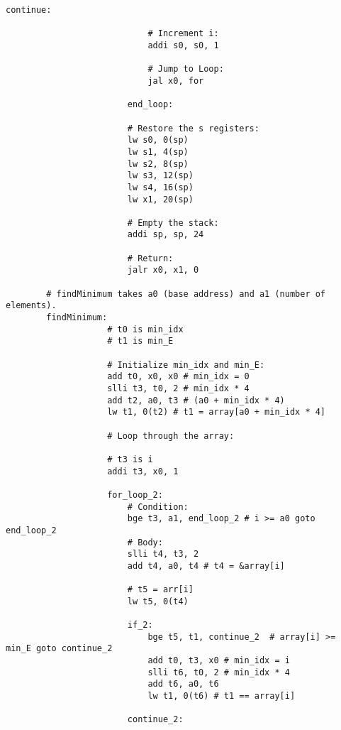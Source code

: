 \documentclass[12pt]{article}
\begin{document}
\begin{lstlisting}[language=RISCV]
                            continue:

                            # Increment i:
                            addi s0, s0, 1

                            # Jump to Loop:
                            jal x0, for

                        end_loop:

                        # Restore the s registers:
                        lw s0, 0(sp)
                        lw s1, 4(sp)
                        lw s2, 8(sp)
                        lw s3, 12(sp)
                        lw s4, 16(sp)
                        lw x1, 20(sp)

                        # Empty the stack:
                        addi sp, sp, 24 

                        # Return:
                        jalr x0, x1, 0

        # findMinimum takes a0 (base address) and a1 (number of elements).
        findMinimum:
                    # t0 is min_idx
                    # t1 is min_E

                    # Initialize min_idx and min_E:
                    add t0, x0, x0 # min_idx = 0
                    slli t3, t0, 2 # min_idx * 4
                    add t2, a0, t3 # (a0 + min_idx * 4) 
                    lw t1, 0(t2) # t1 = array[a0 + min_idx * 4]

                    # Loop through the array:

                    # t3 is i
                    addi t3, x0, 1

                    for_loop_2:
                        # Condition:
                        bge t3, a1, end_loop_2 # i >= a0 goto end_loop_2
                        # Body:
                        slli t4, t3, 2
                        add t4, a0, t4 # t4 = &array[i]
                        
                        # t5 = arr[i]
                        lw t5, 0(t4)

                        if_2:
                            bge t5, t1, continue_2  # array[i] >= min_E goto continue_2  
                            add t0, t3, x0 # min_idx = i
                            slli t6, t0, 2 # min_idx * 4
                            add t6, a0, t6
                            lw t1, 0(t6) # t1 == array[i]

                        continue_2:
                        

\end{lstlisting}
\end{document}
